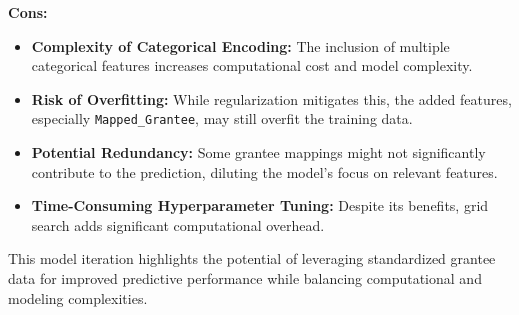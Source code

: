 \textbf{Cons:}
\begin{itemize}
    \item \textbf{Complexity of Categorical Encoding:} The inclusion of multiple categorical features increases computational cost and model complexity.
    \item \textbf{Risk of Overfitting:} While regularization mitigates this, the added features, especially \texttt{Mapped\_Grantee}, may still overfit the training data.
    \item \textbf{Potential Redundancy:} Some grantee mappings might not significantly contribute to the prediction, diluting the model's focus on relevant features.
    \item \textbf{Time-Consuming Hyperparameter Tuning:} Despite its benefits, grid search adds significant computational overhead.
\end{itemize}

This model iteration highlights the potential of leveraging standardized grantee data for improved predictive performance while balancing computational and modeling complexities. \\

\hrulefill

